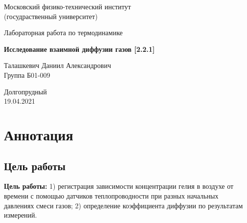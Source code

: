 \documentclass[a4paper,11.5pt]{article} %
\begin{document}


\begin{titlepage}

\newpage
\begin{center}
\normalsize Московский физико-технический институт \\(госудраственный университет)
\end{center}

\vspace{6em}

\begin{center}
\Large Лабораторная работа по термодинамике\\
\end{center}

\vspace{1em}

\begin{center}
\large \textbf{Исследование взаимной диффузии газов [2.2.1]}
\end{center}

\vspace{2em}

\begin{center}
\large Талашкевич Даниил Александрович\\
Группа Б01-009
\end{center}

\vspace{\fill}

\begin{center}
Долгопрудный \\19.04.2021
\end{center}

\end{titlepage}



\thispagestyle{empty}
\newpage
\tableofcontents
\newpage
\setcounter{page}{1}


\section{Аннотация}
\subsection{Цель работы}

\textbf{Цель работы:} 1) регистрация зависимости концентрации гелия в воздухе от времени с помощью датчиков теплопроводности при разных начальных давлениях смеси газов; 2) определение коэффициента диффузии по результатам измерений.
\end{document}
